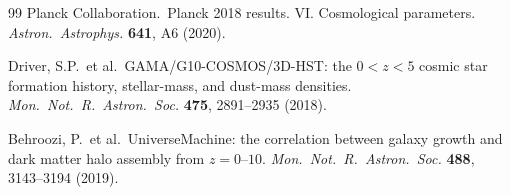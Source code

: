 \documentclass[12pt,a4paper]{article}
\begin{document}
\begin{thebibliography}{99}
Planck Collaboration.\ Planck 2018 results. VI. Cosmological parameters. {\it Astron.\ Astrophys.} {\bf 641}, A6 (2020).

Driver, S.P.\ et al.\ GAMA/G10-COSMOS/3D-HST: the $0<z<5$ cosmic star formation history, stellar-mass, and dust-mass densities. {\it Mon.\ Not.\ R.\ Astron.\ Soc.} {\bf 475}, 2891--2935 (2018).

Behroozi, P.\ et al.\ UniverseMachine: the correlation between galaxy growth and dark matter halo assembly from $z=0$--$10$. {\it Mon.\ Not.\ R.\ Astron.\ Soc.} {\bf 488}, 3143--3194 (2019).

\end{thebibliography}
\end{document}
